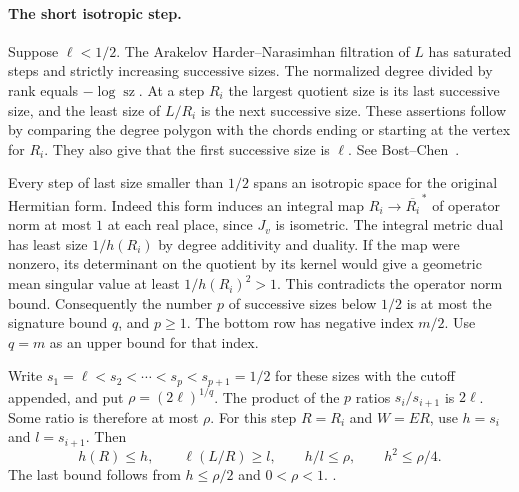 \paragraph{The short isotropic step.}
Suppose \(\ell<1/2\). The Arakelov Harder--Narasimhan
filtration of \(L\) has saturated steps and strictly
increasing successive sizes. The normalized degree
divided by rank equals \(-\log\operatorname{sz}\).
At a step \(R_i\) the largest quotient size is its last
successive size, and the least size of \(L/R_i\) is the
next successive size. These assertions follow by comparing
the degree polygon with the chords ending or starting at
the vertex for \(R_i\). They also give that the first
successive size is \(\ell\).
See Bost--Chen~\cite[\S\S1.2--1.3]{lt4bostchen}.

Every step of last size smaller than \(1/2\) spans an
isotropic space for the original Hermitian form. Indeed this
form induces an integral map \(R_i\to\overline{R_i}^{\,*}\)
of operator norm at most \(1\) at each real place, since
\(J_v\) is isometric. The integral metric dual has least
size \(1/h(R_i)\) by degree additivity and duality. If the
map were nonzero, its determinant on the quotient by its
kernel would give a geometric mean singular value at least
\(1/h(R_i)^2>1\). This contradicts the operator norm bound.
Consequently the number \(p\) of successive sizes below
\(1/2\) is at most the signature bound \(q\), and \(p\ge1\).
The bottom row has negative index \(m/2\). Use \(q=m\) as
an upper bound for that index.

Write \(s_1=\ell<s_2<\cdots<s_p<s_{p+1}=1/2\) for these
sizes with the cutoff appended, and put \(\rho=(2\ell)^{1/q}\).
The product of the \(p\) ratios \(s_i/s_{i+1}\) is
\(2\ell\). Some ratio is therefore at most \(\rho\).
For this step \(R=R_i\) and \(W=ER\), use
\(h=s_i\) and \(l=s_{i+1}\). Then
\[
 h(R)\le h,\qquad \ell(L/R)\ge l,\qquad
 h/l\le\rho,\qquad h^2\le\rho/4 .
\]
The last bound follows from \(h\le\rho/2\) and \(0<\rho<1\).
.

